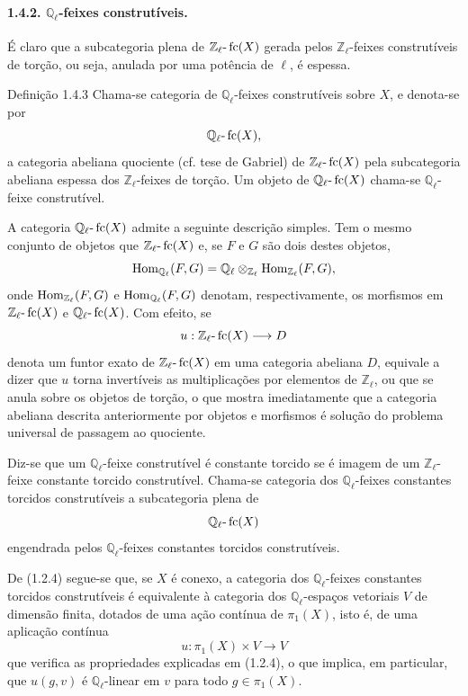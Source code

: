 \paragraph{1.4.2. \(\mathbb Q_\ell\)-feixes construtíveis.}
É claro que a subcategoria plena de \(\mathbb Z_\ell\text{-}\operatorname{fc}(X)\) gerada pelos \(\mathbb Z_\ell\)-feixes construtíveis de torção, ou seja, anulada por uma potência de \(\ell\), é espessa.

\begin{statement}{Definição 1.4.3}
Chama-se categoria de \(\mathbb Q_\ell\)-feixes construtíveis sobre \(X\), e denota-se por
\[
\mathbb Q_\ell\text{-}\operatorname{fc}(X),
\]
a categoria abeliana quociente (cf. tese de Gabriel) de \(\mathbb Z_\ell\text{-}\operatorname{fc}(X)\) pela subcategoria abeliana espessa dos \(\mathbb Z_\ell\)-feixes de torção. Um objeto de \(\mathbb Q_\ell\text{-}\operatorname{fc}(X)\) chama-se \(\mathbb Q_\ell\)-feixe construtível.
\end{statement}

A categoria \(\mathbb Q_\ell\text{-}\operatorname{fc}(X)\) admite a seguinte descrição simples. Tem o mesmo conjunto de objetos que \(\mathbb Z_\ell\text{-}\operatorname{fc}(X)\) e, se \(F\) e \(G\) são dois destes objetos,
\[
\operatorname{Hom}_{\mathbb Q_\ell}(F,G)
=\mathbb Q_\ell\otimes_{\mathbb Z_\ell}\operatorname{Hom}_{\mathbb Z_\ell}(F,G),
\]
onde \(\operatorname{Hom}_{\mathbb Z_\ell}(F,G)\) e \(\operatorname{Hom}_{\mathbb Q_\ell}(F,G)\) denotam, respectivamente, os morfismos em \(\mathbb Z_\ell\text{-}\operatorname{fc}(X)\) e \(\mathbb Q_\ell\text{-}\operatorname{fc}(X)\). Com efeito, se
\[
u:\mathbb Z_\ell\text{-}\operatorname{fc}(X)\longrightarrow D
\]
denota um funtor exato de \(\mathbb Z_\ell\text{-}\operatorname{fc}(X)\) em uma categoria abeliana \(D\), equivale a dizer que \(u\) torna invertíveis as multiplicações por elementos de \(\mathbb Z_\ell\), ou que se anula sobre os objetos de torção, o que mostra imediatamente que a categoria abeliana descrita anteriormente por objetos e morfismos é solução do problema universal de passagem ao quociente.

Diz-se que um \(\mathbb Q_\ell\)-feixe construtível é constante torcido se é imagem de um \(\mathbb Z_\ell\)-feixe constante torcido construtível. Chama-se categoria dos \(\mathbb Q_\ell\)-feixes constantes torcidos construtíveis a subcategoria plena de
\[
\mathbb Q_\ell\text{-}\operatorname{fc}(X)
\]
engendrada pelos \(\mathbb Q_\ell\)-feixes constantes torcidos construtíveis.

De (1.2.4) segue-se que, se \(X\) é conexo, a categoria dos \(\mathbb Q_\ell\)-feixes constantes torcidos construtíveis é equivalente à categoria dos \(\mathbb Q_\ell\)-espaços vetoriais \(V\) de dimensão finita, dotados de uma ação contínua de \(\pi_1(X)\), isto é, de uma aplicação contínua
\[
u:\pi_1(X)\times V\longrightarrow V
\]
que verifica as propriedades explicadas em (1.2.4), o que implica, em particular, que \(u(g,v)\) é \(\mathbb Q_\ell\)-linear em \(v\) para todo \(g\in\pi_1(X)\).

